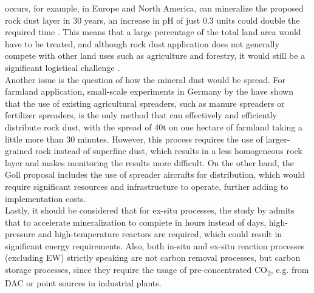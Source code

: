 occurs, for example, in Europe and North America, can mineralize the proposed rock dust layer in 30 years, an increase in pH of just 0.3 units could double the required time \parencite{Schuiling2006EnhancedCo2}. This means that a large percentage of the total land area would have to be treated, and although rock dust application does not generally compete with other land uses such as agriculture and forestry, it would still be a significant logistical challenge \parencite{Dipple2021TheSystems}.\\Another issue is the question of how the mineral dust would be spread. For farmland application, small-scale experiments in Germany by the \textcite{CarbonDrawdownInitiative2022HowExperiments} have shown that the use of existing agricultural spreaders, such as manure spreaders or fertilizer spreaders, is the only method that can effectively and efficiently distribute rock dust, with the spread of 40t on one hectare of farmland taking a little more than 30 minutes. However, this process requires the use of larger-grained rock instead of superfine dust, which results in a less homogeneous rock layer and makes monitoring the results more difficult. On the other hand, the Goll proposal includes the use of spreader aircrafts for distribution, which would require significant resources and infrastructure to operate, further adding to implementation costs.\\Lastly, it should be considered that for ex-situ processes, the study by \textcite{Lackner1997ProgressSubstrates} admits that to accelerate mineralization to complete in hours instead of days, high-pressure and high-temperature reactors are required, which could result in significant energy requirements. Also, both in-situ and ex-situ reaction processes (excluding EW) strictly speaking are not carbon removal processes, but carbon storage processes, since they require the usage of pre-concentrated CO\textsubscript{2}, e.g. from DAC or point sources in industrial plants.
